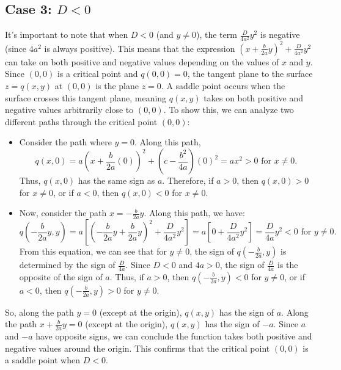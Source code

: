 \documentclass{article}
\begin{document}
\subsection{Case 3: \( D < 0 \)}

It's important to note that when \( D < 0 \) (and \( y \ne 0 \)), the term \( \frac{D}{4a^{2}}y^{2} \) is negative (since \( 4a^{2} \) is always positive). This means that the expression \( (x + \frac{b}{2a}y)^{2} + \frac{D}{4a^{2}}y^{2} \) can take on both positive and negative values depending on the values of \( x \) and \( y \). Since \( (0,0) \) is a critical point and \( q(0,0) = 0 \), the tangent plane to the surface \( z = q(x,y) \) at \( (0,0) \) is the plane \( z = 0 \). A saddle point occurs when the surface crosses this tangent plane, meaning \( q(x,y) \) takes on both positive and negative values arbitrarily close to \( (0,0) \). To show this, we can analyze two different paths through the critical point \( (0, 0) \):
\begin{itemize}
	\item Consider the path where \( y = 0 \). Along this path,
	\[
		q(x, 0) = a\left(x + \frac{b}{2a}(0)\right)^{2} + \left( c - \frac{b^{2}}{4a} \right)(0)^{2} = ax^{2} > 0 \text{ for } x \ne 0.
	\]
	Thus, \( q(x,0) \) has the same sign as \( a \). Therefore, if \( a > 0 \), then \( q(x,0) > 0 \) for \( x \ne 0 \), or if \( a < 0 \), then \( q(x,0) < 0 \) for \( x \ne 0 \).
	\item Now, consider the path \( x = -\frac{b}{2a}y \). Along this path, we have:
	\[
		q\left(-\frac{b}{2a}y, y\right) = a\left[\left(-\frac{b}{2a}y + \frac{b}{2a}y\right)^{2} + \frac{D}{4a^{2}}y^{2}\right] = a\left[0 + \frac{D}{4a^{2}}y^{2}\right] = \frac{D}{4a}y^{2} < 0 \text{ for } y \ne 0.
	\]
	From this equation, we can see that for \( y \ne 0 \), the sign of \( q(-\frac{b}{2a},y) \) is determined by the sign of \( \frac{D}{4a} \). Since \( D < 0 \) and \( 4a > 0 \), the sign of \( \frac{D}{4a} \) is the opposite of the sign of \( a \). Thus, if \( a > 0 \), then \( q(-\frac{b}{2a},y) < 0 \) for \( y \ne 0 \), or if \( a < 0 \), then \( q(-\frac{b}{2a},y) > 0 \) for \( y \ne 0 \).
\end{itemize}
So, along the path \( y = 0 \) (except at the origin), \( q(x,y) \) has the sign of \( a \). Along the path \( x + \frac{b}{2a}y = 0 \) (except at the origin), \( q(x,y) \) has the sign of \( -a \). Since \( a \) and \( -a \) have opposite signs, we can conclude the function takes both positive and negative values around the origin. This confirms that the critical point \( (0, 0) \) is a saddle point when \( D < 0 \). 
\end{document}
